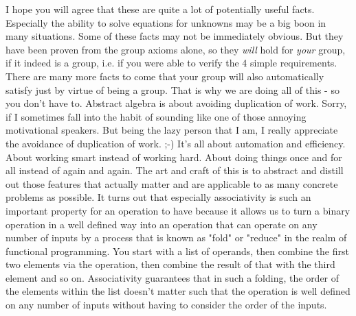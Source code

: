 \medskip
I hope you will agree that these are quite a lot of potentially useful facts. Especially the ability to solve equations for unknowns  may be a big boon in many situations. Some of these facts may not be immediately obvious. But they have been proven from the group axioms alone, so they \emph{will} hold for \emph{your} group, if it indeed is a group, i.e. if you were able to verify the 4 simple requirements. There are many more facts to come that your group will also automatically satisfy just by virtue of being a group. That is why we are doing all of this - so you don't have to. Abstract algebra is about avoiding duplication of work. Sorry, if I sometimes fall into the habit of sounding like one of those annoying motivational speakers. But being the lazy person that I am, I really appreciate the avoidance of duplication of work. ;-) It's all about automation and efficiency. About working smart instead of working hard. About doing things once and for all instead of again and again. The art and craft of this is to abstract and distill out those features that actually matter and are applicable to as many concrete problems as possible. It turns out that especially associativity is such an important property for an operation to have because it allows us to turn a binary operation in a well defined way into an operation that can operate on any number of inputs by a process that is known as "fold" or "reduce" in the realm of functional programming. You start with a list of operands, then combine the first two elements via the operation, then combine the result of that with the third element and so on. Associativity guarantees that in such a folding, the order of the elements within the list doesn't matter such that the operation is well defined on any number of inputs without having to consider the order of the inputs.


\medskip


